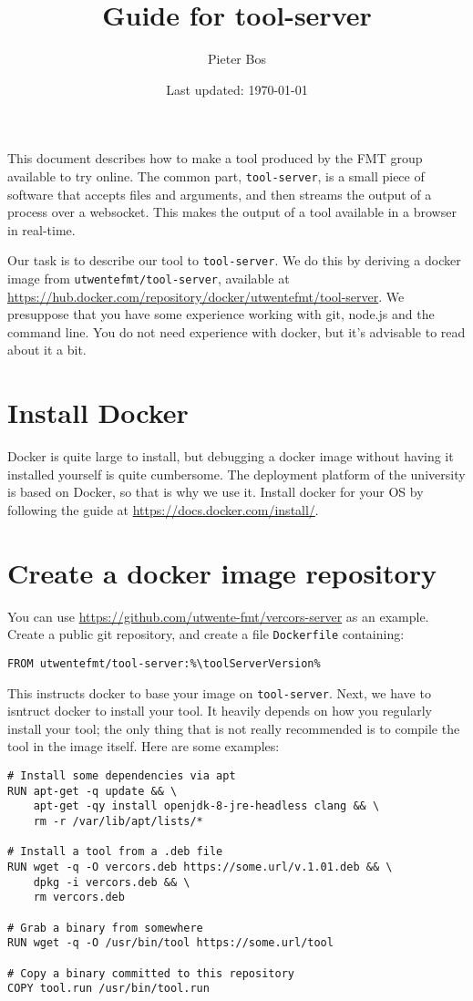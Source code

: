 \documentclass{article}
\author{Pieter Bos}
\title{Guide for tool-server}
\date{Last updated: \today}
\newcommand{\ts}{\texttt{tool-server}}
\begin{document}
\maketitle

This document describes how to make a tool produced by the FMT group available to try online. The common part, \ts, is a small piece of software that accepts files and arguments, and then streams the output of a process over a websocket. This makes the output of a tool available in a browser in real-time.

Our task is to describe our tool to \ts. We do this by deriving a docker image from \texttt{utwentefmt/tool-server}, available at \url{https://hub.docker.com/repository/docker/utwentefmt/tool-server}. We presuppose that you have some experience working with git, node.js and the command line. You do not need experience with docker, but it's advisable to read about it a bit.

\section{Install Docker}
Docker is quite large to install, but debugging a docker image without having it installed yourself is quite cumbersome. The deployment platform of the university is based on Docker, so that is why we use it. Install docker for your OS by following the guide at \url{https://docs.docker.com/install/}.

\section{Create a docker image repository}
You can use \url{https://github.com/utwente-fmt/vercors-server} as an example. Create a public git repository, and create a file \texttt{Dockerfile} containing:

\begin{lstlisting}[escapechar=\%]
FROM utwentefmt/tool-server:%\toolServerVersion%
\end{lstlisting}

This instructs docker to base your image on \ts. Next, we have to isntruct docker to install your tool. It heavily depends on how you regularly install your tool; the only thing that is not really recommended is to compile the tool in the image itself. Here are some examples:

\begin{lstlisting}
# Install some dependencies via apt
RUN apt-get -q update && \
    apt-get -qy install openjdk-8-jre-headless clang && \
    rm -r /var/lib/apt/lists/*

# Install a tool from a .deb file
RUN wget -q -O vercors.deb https://some.url/v.1.01.deb && \
    dpkg -i vercors.deb && \
    rm vercors.deb

# Grab a binary from somewhere
RUN wget -q -O /usr/bin/tool https://some.url/tool

# Copy a binary committed to this repository
COPY tool.run /usr/bin/tool.run
\end{lstlisting}
\end{document}
